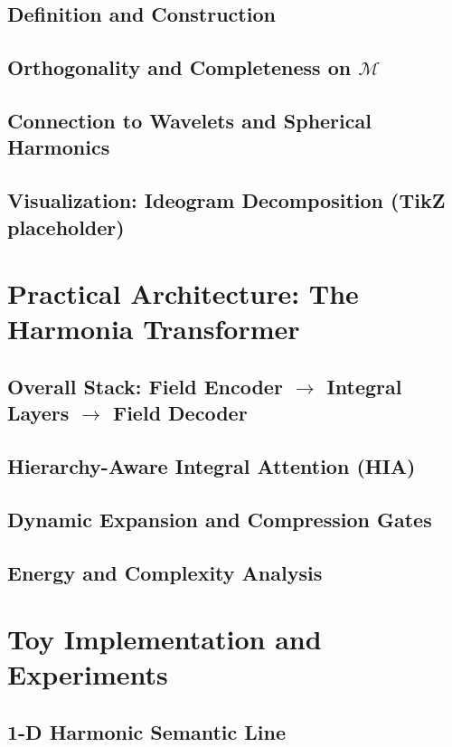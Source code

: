 \documentclass[11pt]{article}
\newcommand{\Manifold}{\mathcal{M}}
\begin{document}
\subsection{Definition and Construction}
\subsection{Orthogonality and Completeness on $\Manifold$}
\subsection{Connection to Wavelets and Spherical Harmonics}
\subsection{Visualization: Ideogram Decomposition (TikZ placeholder)}

\section{Practical Architecture: The Harmonia Transformer}
\subsection{Overall Stack: Field Encoder $\rightarrow$ Integral Layers $\rightarrow$ Field Decoder}
\subsection{Hierarchy-Aware Integral Attention (HIA)}
\subsection{Dynamic Expansion and Compression Gates}
\subsection{Energy and Complexity Analysis}

\section{Toy Implementation and Experiments}
\subsection{1-D Harmonic Semantic Line}
\end{document}
